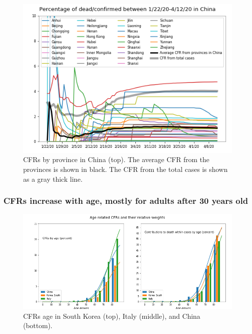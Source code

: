 \documentclass[8pt]{article}
\begin{document}
\begin{figure}[h]
    \centering
    \begin{minipage}{0.6\textwidth}
    \includegraphics[width=\textwidth]{figures/tsam_COVID19_JHU_cfr_ProvincesChina_fromFirstLocalReport.png}
    \end{minipage}%
    \begin{minipage}{0.4\textwidth}
    \caption{CFRs by province in China (top). The average CFR from the provinces is shown in black. The CFR from the total cases is shown as a gray thick line.}
    \label{fig:cfrsProvinces}
    \end{minipage}
\end{figure}

\subsubsection{CFRs increase with age, mostly for adults after 30 years old}

\begin{figure}[h]
    \centering
    \includegraphics[width=\textwidth]{figures/tsam_COVID19_JHU_cfr+propDeathCases_ByAge_China+SKorea+Italy_OneFigure.png}
    \caption{CFRs age in South Korea (top), Italy (middle), and China (bottom).}
    \label{fig:cfrsAge}
\end{figure}
\end{document}
